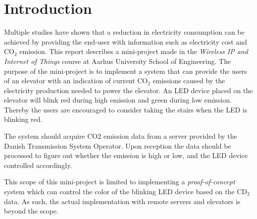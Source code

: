 \documentclass[Main]{subfiles}
\begin{document}
\section{Introduction} %
\label{sec:introduction}
	Multiple studies have shown that a reduction in electricity consumption can be achieved by providing the end-user with information such as electricity cost and CO$_2$ emission\cite{Tricascade:2009:Online}. 
	This report describes a mini-project made in the \textit{Wireless IP and Internet of Things} course at Aarhus University School of Engineering. 
	The purpose of the mini-project is to implement a system that can provide the users of an elevator with an indication of current CO$_2$ emissions caused by the electricity production needed to power the elevator. 
	An LED device placed on the elevator will blink red during high emission and green during low emission. 
	Thereby the users are encouraged to consider taking the stairs when the LED is blinking red. 

	The system should acquire CO$2$ emission data from a server provided by the Danish Transmission System Operator. Upon reception the data should be processed to figure out whether the emission is high or low, and the LED device controlled accordingly.

	This scope of this mini-project is limited to implementing a \textit{proof-of-concept} system which can control the color of the blinking LED device based on the CD$_2$ data. As such, the actual implementation with remote servers and elevators is beyond the scope.



\end{document}
